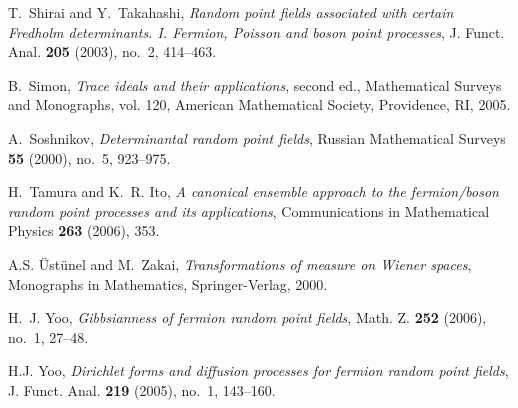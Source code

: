 \documentclass[11pt,a4paper]{amsart}
\begin{document}
\begin{thebibliography}{10}
 T.~Shirai and Y.~Takahashi, \emph{Random point
    fields associated with certain {F}redholm
    determinants. {I}. {F}ermion, {P}oisson and boson point
    processes}, J. Funct. Anal. \textbf{205} (2003), no.~2, 414--463.
 

 B.~Simon, \emph{Trace ideals and their
    applications}, second ed., Mathematical Surveys and Monographs,
  vol. 120, American Mathematical Society, Providence, RI, 2005.

 A.~Soshnikov, \emph{Determinantal random
    point fields}, Russian Mathematical Surveys \textbf{55} (2000),
  no.~5, 923--975.

 H.~Tamura and K.~R. Ito, \emph{A canonical
    ensemble approach to the fermion/boson random point processes and
    its applications}, Communications in Mathematical Physics
  \textbf{263} (2006), 353.

 A.S. {\"U}st{\"u}nel and M.~Zakai,
  \emph{Transformations of measure on {W}iener spaces}, Monographs in
  {M}athematics, Springer-Verlag, 2000.

 H.~J. Yoo, \emph{Gibbsianness of fermion random
    point fields}, Math. Z.  \textbf{252} (2006), no.~1, 27--48.

 H.J. Yoo, \emph{{D}irichlet forms and diffusion
    processes for fermion random point fields},
  J. Funct. Anal. \textbf{219} (2005), no.~1, 143--160.
  

\end{thebibliography}
\end{document}
